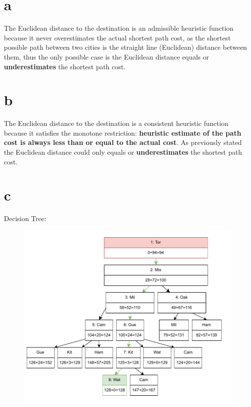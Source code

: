 \documentclass[12pt]{article}
\begin{document}
\subsection{} 
\begin{enumerate}
\part{a} 
	The Euclidean distance to the destination is an admissible heuristic function because it never overestimates the actual shortest path cost, as the shortest possible path between two cities is the straight line (Euclidean) distance between them, thus the only possible case is the Euclidean distance equals or \textbf{underestimates} the shortest path cost.

\part{b} 
	The Euclidean distance to the destination is a consistent heuristic function because it satisfies the monotone restriction: \textbf{heuristic estimate of the path cost is always less than or equal to the actual cost}. As previously stated the Euclidean distance could only equals or \textbf{underestimates} the shortest path cost.

\part{c} Decision Tree:
	\begin{figure}[H]
	\center
	\includegraphics[width=12cm]{486A1Q1.pdf}
	\end{figure}

\end{enumerate}
\end{document}
